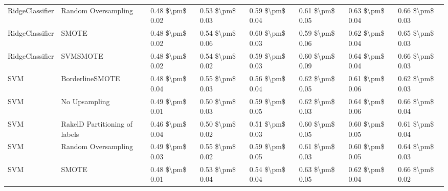\begin{tabular}{llllllll}
                RidgeClassifier &           Random Oversampling & 0.48 \$\textbackslash pm\$ 0.02 &           0.53 \$\textbackslash pm\$ 0.03 &       0.59 \$\textbackslash pm\$ 0.04 &        0.61 \$\textbackslash pm\$ 0.05 &                         0.63 \$\textbackslash pm\$ 0.04 &     0.66 \$\textbackslash pm\$ 0.03 \\
                RidgeClassifier &                         SMOTE & 0.48 \$\textbackslash pm\$ 0.02 &           0.54 \$\textbackslash pm\$ 0.06 &       0.60 \$\textbackslash pm\$ 0.03 &        0.59 \$\textbackslash pm\$ 0.06 &                         0.62 \$\textbackslash pm\$ 0.04 &     0.65 \$\textbackslash pm\$ 0.03 \\
                RidgeClassifier &                      SVMSMOTE & 0.48 \$\textbackslash pm\$ 0.02 &           0.54 \$\textbackslash pm\$ 0.02 &       0.59 \$\textbackslash pm\$ 0.03 &        0.60 \$\textbackslash pm\$ 0.09 &                         0.64 \$\textbackslash pm\$ 0.04 &     0.66 \$\textbackslash pm\$ 0.03 \\
                            SVM &               BorderlineSMOTE & 0.48 \$\textbackslash pm\$ 0.04 &           0.55 \$\textbackslash pm\$ 0.03 &       0.56 \$\textbackslash pm\$ 0.04 &        0.62 \$\textbackslash pm\$ 0.05 &                         0.61 \$\textbackslash pm\$ 0.06 &     0.62 \$\textbackslash pm\$ 0.03 \\
                            SVM &                 No Upsampling & 0.49 \$\textbackslash pm\$ 0.01 &           0.50 \$\textbackslash pm\$ 0.03 &       0.59 \$\textbackslash pm\$ 0.05 &        0.62 \$\textbackslash pm\$ 0.03 &                         0.64 \$\textbackslash pm\$ 0.06 &     0.66 \$\textbackslash pm\$ 0.04 \\
                            SVM & RakelD Partitioning of labels & 0.46 \$\textbackslash pm\$ 0.04 &           0.50 \$\textbackslash pm\$ 0.02 &       0.51 \$\textbackslash pm\$ 0.03 &        0.60 \$\textbackslash pm\$ 0.05 &                         0.60 \$\textbackslash pm\$ 0.05 &     0.61 \$\textbackslash pm\$ 0.04 \\
                            SVM &           Random Oversampling & 0.49 \$\textbackslash pm\$ 0.03 &           0.55 \$\textbackslash pm\$ 0.02 &       0.59 \$\textbackslash pm\$ 0.05 &        0.61 \$\textbackslash pm\$ 0.03 &                         0.60 \$\textbackslash pm\$ 0.05 &     0.64 \$\textbackslash pm\$ 0.03 \\
                            SVM &                         SMOTE & 0.48 \$\textbackslash pm\$ 0.01 &           0.53 \$\textbackslash pm\$ 0.04 &       0.54 \$\textbackslash pm\$ 0.04 &        0.63 \$\textbackslash pm\$ 0.05 &                         0.62 \$\textbackslash pm\$ 0.04 &     0.66 \$\textbackslash pm\$ 0.02 \\

\end{tabular}
